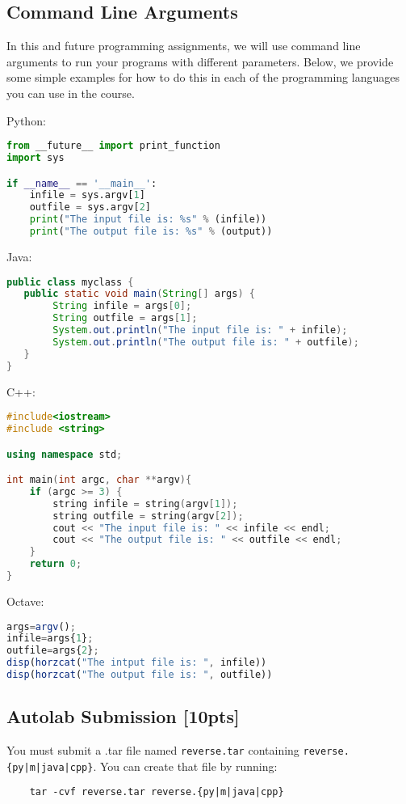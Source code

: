 \documentclass[12pt]{article}
\begin{document}
\subsection{Command Line Arguments}

In this and future programming assignments, we will use command line arguments to run your programs with different parameters. Below, we provide some simple examples for how to do this in each of the programming languages you can use in the course.

Python:
\begin{lstlisting}[language=Python]
from __future__ import print_function
import sys

if __name__ == '__main__':
    infile = sys.argv[1]
    outfile = sys.argv[2]
    print("The input file is: %s" % (infile))
    print("The output file is: %s" % (output))
\end{lstlisting}
 
Java:
\begin{lstlisting}[language=Java]
public class myclass {
   public static void main(String[] args) {
        String infile = args[0];
        String outfile = args[1];
        System.out.println("The input file is: " + infile);
        System.out.println("The output file is: " + outfile);
   }
}
\end{lstlisting}

C++:
\begin{lstlisting}[language=C++]
#include<iostream>
#include <string>

using namespace std;

int main(int argc, char **argv){
    if (argc >= 3) {
        string infile = string(argv[1]);
        string outfile = string(argv[2]);
        cout << "The input file is: " << infile << endl;
        cout << "The output file is: " << outfile << endl;
    }
    return 0;
}
\end{lstlisting}

Octave:
\begin{lstlisting}[language=Octave]
args=argv();
infile=args{1};
outfile=args{2};
disp(horzcat("The intput file is: ", infile))
disp(horzcat("The output file is: ", outfile))
\end{lstlisting}

\subsection{Autolab Submission [10pts]}

You must submit a .tar file named \texttt{reverse.tar} containing \texttt{reverse.\{py|m|java|cpp\}}. You can create that file by running:
\begin{verbatim}    tar -cvf reverse.tar reverse.{py|m|java|cpp}\end{verbatim}
\end{document}

